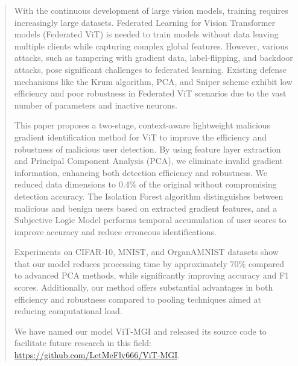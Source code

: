 \documentclass[conference]{IEEEtran}
\begin{document}
\begin{abstract}
With the continuous development of large vision models, training requires increasingly large datasets. Federated Learning for Vision Transformer models (Federated ViT) is needed to train models without data leaving multiple clients while capturing complex global features. However, various attacks, such as tampering with gradient data, label-flipping, and backdoor attacks, pose significant challenges to federated learning. Existing defense mechanisms like the Krum algorithm, PCA, and Sniper scheme exhibit low efficiency and poor robustness in Federated ViT scenarios due to the vast number of parameters and inactive neurons.

This paper proposes a two-stage, context-aware lightweight malicious gradient identification method for ViT to improve the efficiency and robustness of malicious user detection. By using feature layer extraction and Principal Component Analysis (PCA), we eliminate invalid gradient information, enhancing both detection efficiency and robustness. We reduced data dimensions to 0.4\% of the original without compromising detection accuracy. The Isolation Forest algorithm distinguishes between malicious and benign users based on extracted gradient features, and a Subjective Logic Model performs temporal accumulation of user scores to improve accuracy and reduce erroneous identifications.

Experiments on CIFAR-10, MNIST, and OrganAMNIST datasets show that our model reduces processing time by approximately 70\% compared to advanced PCA methods, while significantly improving accuracy and F1 scores. Additionally, our method offers substantial advantages in both efficiency and robustness compared to pooling techniques aimed at reducing computational load.

We have named our model ViT-MGI and released its source code to facilitate future research in this field: \href{https://github.com/LetMeFly666/ViT-MGI}{https://github.com/LetMeFly666/ViT-MGI}.








\end{abstract}
\end{document}

